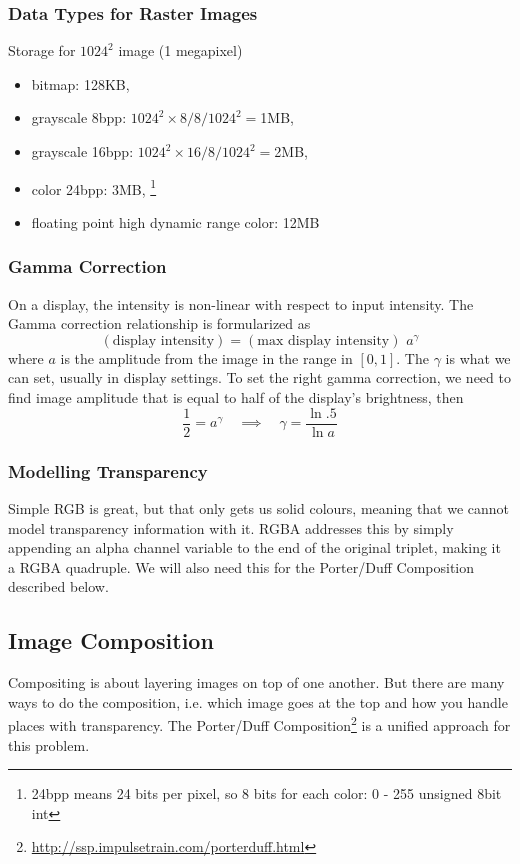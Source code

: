 \documentclass[11pt]{article}
\begin{document}
\subsubsection{Data Types for Raster Images}
Storage for $1024^2$ image (1 megapixel)
\begin{itemize}
	\item bitmap: 128KB, 
	\item grayscale 8bpp: $1024^2 \times 8 / 8 / 1024^2 = $1MB, 
	\item grayscale 16bpp: $1024^2 \times 16 / 8 / 1024^2 = $2MB, 
	\item color 24bpp: 3MB, \footnote{24bpp means 24 bits per pixel, so 8 bits for each color: 0 - 255 unsigned 8bit int}
	\item floating point high dynamic range color: 12MB
\end{itemize}

\subsubsection{Gamma Correction}
On a display, the intensity is non-linear with respect to input intensity. The Gamma correction relationship is formularized as 
\begin{equation}
	(\text{display intensity}) = (\text{max display intensity}) \,\, a^\gamma
\end{equation}
where $a$ is the amplitude from the image in the range in $[0, 1]$. The $\gamma$ is what we can set, usually in display settings. To set the right gamma correction, we need to find image amplitude that is equal to half of the display's brightness, then
\begin{equation}
	\frac{1}{2} = a^\gamma \quad 
	\implies \quad
	\gamma = \frac{\ln .5}{\ln a}
\end{equation}

\subsubsection{Modelling Transparency}
Simple RGB is great, but that only gets us solid colours, meaning that we cannot model transparency information with it. RGBA addresses this by simply appending an alpha channel variable to the end of the original triplet, making it a RGBA quadruple. We will also need this for the Porter/Duff Composition described below. 

\subsection{Image Composition}
Compositing is about layering images on top of one another. But there are many ways to do the composition, i.e. which image goes at the top and how you handle places with transparency. The Porter/Duff Composition\footnote{\url{http://ssp.impulsetrain.com/porterduff.html}} is a unified approach for this problem. 
\end{document}
